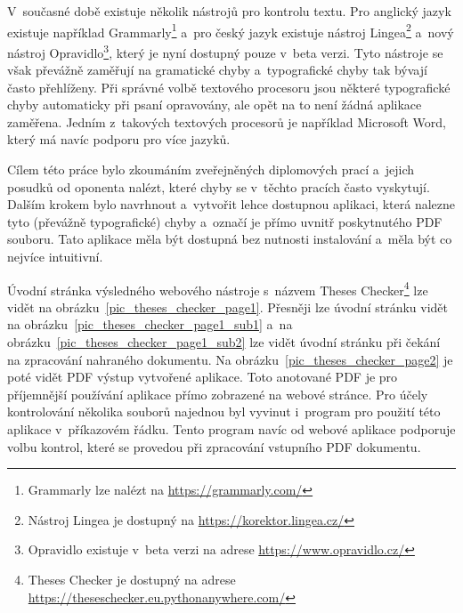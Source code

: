 V~současné době existuje několik nástrojů pro kontrolu textu.
Pro anglický jazyk existuje například Grammarly\footnote{
    Grammarly lze nalézt na \href{https://grammarly.com/}{https://grammarly.com/}
} a~pro český jazyk existuje nástroj Lingea\footnote{
    Nástroj Lingea je dostupný na \href{https://korektor.lingea.cz/}{https://korektor.lingea.cz/}
} a~nový nástroj Opravidlo\footnote{
    Opravidlo existuje v~beta verzi na adrese \href{https://www.opravidlo.cz/}{https://www.opravidlo.cz/}
}, který je nyní dostupný pouze v~beta verzi. Tyto nástroje se
však převážně zaměřují na gramatické chyby a~typografické chyby tak bývají často
přehlíženy. Při správné volbě textového procesoru jsou některé typografické 
chyby automaticky při psaní opravovány, ale opět na to není žádná aplikace
zaměřena. Jedním z~takových textových procesorů je například Microsoft Word,
který má navíc podporu pro více jazyků. 

Cílem této práce bylo zkoumáním zveřejněných diplomových prací a~jejich posudků
od oponenta nalézt, které chyby se v~těchto pracích často vyskytují. Dalším
krokem bylo navrhnout a~vytvořit lehce
dostupnou aplikaci, která nalezne tyto (převážně typografické) chyby a~označí
je přímo uvnitř poskytnutého PDF souboru. Tato aplikace měla být dostupná bez
nutnosti instalování a~měla být co nejvíce intuitivní.

Úvodní stránka výsledného webového nástroje s~názvem Theses
Checker\footnote{Theses Checker je dostupný na adrese
    \href{https://theseschecker.eu.pythonanywhere.com/}{https://theseschecker.eu.pythonanywhere.com/}
} lze vidět na
obrázku~\ref{pic_theses_checker_page1}. Přesněji lze úvodní stránku vidět
na obrázku~\ref{pic_theses_checker_page1_sub1} a~na
obrázku~\ref{pic_theses_checker_page1_sub2} lze vidět úvodní stránku
při čekání na zpracování nahraného dokumentu. 
 Na obrázku~\ref{pic_theses_checker_page2}
je poté vidět PDF výstup vytvořené aplikace. Toto anotované PDF je pro
příjemnější používání aplikace přímo zobrazené na webové stránce.
Pro účely kontrolování několika souborů najednou byl vyvinut i~program
pro použití této aplikace v~příkazovém řádku. Tento program navíc od webové
aplikace podporuje volbu kontrol, které se provedou při zpracování vstupního PDF 
dokumentu.

\clearpage %

